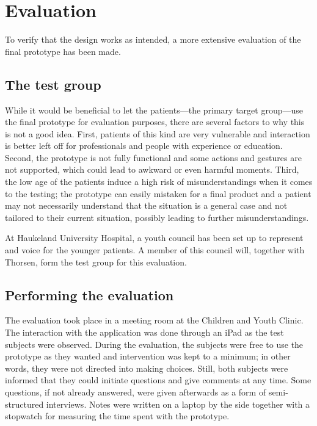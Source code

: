 \chapter{Evaluation}
\label{ch:evaluation}

To verify that the design works as intended, a more extensive evaluation of the final prototype has been made.

\section{The test group}

While it would be beneficial to let the patients---the primary target group---use the final prototype for evaluation purposes, there are several factors to why this is not a good idea. First, patients of this kind are very vulnerable and interaction is better left off for professionals and people with experience or education. Second, the prototype is not fully functional and some actions and gestures are not supported, which could lead to awkward or even harmful moments. Third, the low age of the patients induce a high risk of misunderstandings when it comes to the testing; the prototype can easily mistaken for a final product and a patient may not necessarily understand that the situation is a general case and not tailored to their current situation, possibly leading to further misunderstandings.

At Haukeland University Hospital, a youth council has been set up to represent and voice for the younger patients. A member of this council will, together with Thorsen, form the test group for this evaluation.


\section{Performing the evaluation}


The evaluation took place in a meeting room at the Children and Youth Clinic. The interaction with the application was done through an iPad as the test subjects were observed. During the evaluation, the subjects were free to use the prototype as they wanted and intervention was kept to a minimum; in other words, they were not directed into making choices. Still, both subjects were informed that they could initiate questions and give comments at any time. Some questions, if not already answered, were given afterwards as a form of semi-structured interviews. Notes were written on a laptop by the side together with a stopwatch for measuring the time spent with the prototype.

